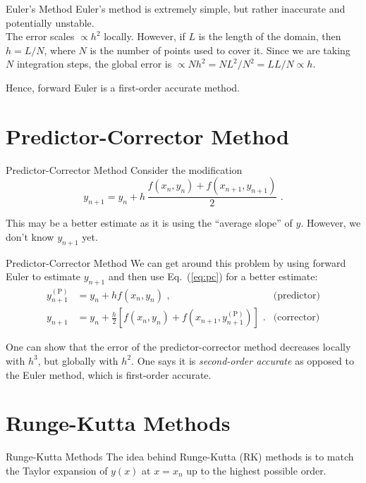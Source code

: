 \documentclass[11pt]{beamer}
\begin{document}
\begin{frame}[fragile]{Euler's Method}
Euler's method is extremely simple, but rather inaccurate and potentially unstable.\\

The error scales $\propto h^2$ locally. However, if $L$ is
the length of the domain, then $h = L / N$, where $N$ is the number of points
used to cover it. Since we are taking $N$ integration steps, the global
error is $\propto N h^2 = N L^2 / N^2 = L L/N \propto h$. \\
\bigskip

Hence, forward
Euler is a first-order accurate method.
\end{frame}

\section{Predictor-Corrector Method}
\begin{frame}[fragile]{Predictor-Corrector Method}
Consider the modification
\begin{equation}
y_{n+1} = y_{n} + h\, \frac{f(x_n, y_n) + f(x_{n+1},y_{n+1})}{2}\,\,.
\label{eq:pc}
\end{equation}

This may be a better estimate as it is using the ``average slope''
of $y$. However, we don't know $y_{n+1}$ yet.
\end{frame}

\begin{frame}[fragile]{Predictor-Corrector Method}
We can get around this problem by using forward Euler to estimate
$y_{n+1}$ and then use Eq.~(\ref{eq:pc}) for a better estimate:
\begin{equation}
\begin{aligned}
y_{n+1}^{(\mathrm{P})} &= y_n + h f(x_n,y_n)\,\,, & \text{(predictor)}\\
y_{n+1} &= y_n + \frac{h}{2} \left[f(x_n,y_n) + f(x_{n+1}, y^{(\mathrm{P})}_{n+1}) \right]\,\,. & \text{(corrector)}
\end{aligned}
\end{equation}

One can show that the error of the predictor-corrector method
decreases locally with $h^3$, but globally with $h^2$.  One says it is
\emph{second-order accurate} as opposed to the Euler method, which is
first-order accurate. 
\end{frame}


\section{Runge-Kutta Methods}
\begin{frame}[fragile]{Runge-Kutta Methods}
The idea behind Runge-Kutta (RK) methods is to match the Taylor expansion
of $y(x)$ at $x=x_n$ up to the highest possible order.
\end{frame}
\end{document}
